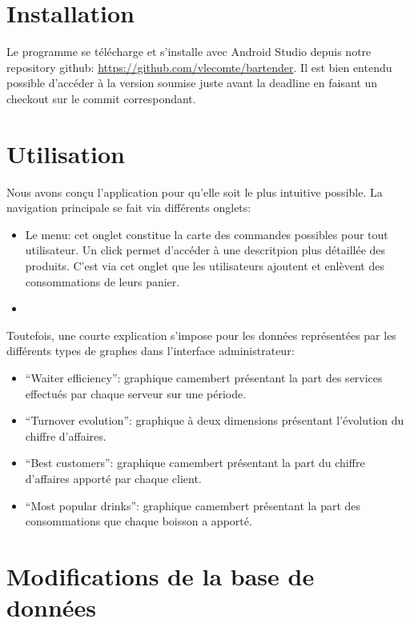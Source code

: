 \documentclass[a4paper,10pt]{article}
\begin{document}

\section{Installation}

Le programme se télécharge et s'installe avec Android Studio depuis notre repository github:
\url{https://github.com/vlecomte/bartender}.
Il est bien entendu possible d'accéder à la version soumise juste avant la deadline en faisant un checkout sur le commit correspondant.

\section{Utilisation}

Nous avons conçu l'application pour qu'elle soit le plus intuitive possible. La navigation principale se fait via différents onglets:
\begin{itemize}
    \item{Le menu: cet onglet constitue la carte des commandes possibles pour tout utilisateur. Un click permet d'accéder à une descritpion plus détaillée des produits. C'est via cet onglet que les utilisateurs ajoutent et enlèvent des consommations de leurs panier.}
    	\item
\end{itemize}
Toutefois, une courte explication s'impose pour les données représentées par les différents types de graphes dans l'interface administrateur:
\begin{itemize}
    \item ``Waiter efficiency'': graphique camembert présentant la part des services effectués par chaque serveur sur une période.
    \item ``Turnover evolution'': graphique à deux dimensions présentant l'évolution du chiffre d'affaires.
    \item ``Best customers'': graphique camembert présentant la part du chiffre d'affaires apporté par chaque client.
    \item ``Most popular drinks'': graphique camembert présentant la part des consommations que chaque boisson a apporté.
\end{itemize}

\section{Modifications de la base de données}
\end{document}
